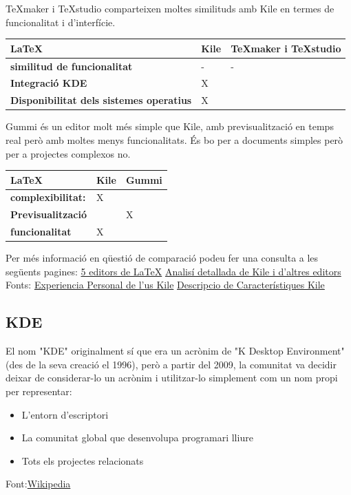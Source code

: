 TeXmaker i TeXstudio comparteixen moltes similituds amb Kile en termes de funcionalitat i d'interfície. \\

\begin{table}[h!]
 \begin{tabular}{|l|l|l|}
\hline
 \LaTeX & \textbf{Kile} & \textbf{TeXmaker i TeXstudio} \\ \hline
 \textbf{similitud de funcionalitat} & - & - \\ \hline
 \textbf{Integració KDE} & X & \\ \hline
 \textbf{Disponibilitat dels sistemes operatius} & X &  \\ \hline
 \end{tabular}
\end{table}

Gummi és un editor molt més simple que Kile, amb previsualització en temps real però amb moltes menys funcionalitats. És bo per a documents simples però per a projectes complexos no. \\
\begin{table}[h!]
 \begin{tabular}{|l|l|l|}
\hline
 \LaTeX & \textbf{Kile} & \textbf{Gummi} \\ \hline
 \textbf{complexibilitat:}  & X &  \\ \hline
 \textbf{Previsualització} &  & X \\ \hline
 \textbf{funcionalitat} & X &  \\ \hline
 \end{tabular}
\end{table}

Per més informació en qüestió de comparació podeu fer una consulta a les següents pagines: \href{https://osluca.uca.es/noticia/cinco-editores-de-latex-libres/}{5 editors de LaTeX} \href{https://latex.org/forum/viewtopic.php?t=208}{Analisí detallada de Kile i d'altres editors}
Fonts: \href{https://iloo.wordpress.com/2010/10/20/kile-otro-editor-latex/}{Experiencia Personal de l'us Kile} \href{https://www.kdeblog.com/editor-de-latex-para-kde-kile.html}{Descripcio de Característiques Kile}

\subsection{KDE}\label{subsec:KDE}
El nom "KDE" originalment sí que era un acrònim de "K Desktop Environment" (des de la seva creació el 1996), però a partir del 2009, la comunitat va decidir deixar de considerar-lo un acrònim i utilitzar-lo simplement com un nom propi per representar:
\begin{itemize}
 \item L'entorn d'escriptori
 \item La comunitat global que desenvolupa programari lliure
 \item Tots els projectes relacionats
\end{itemize}
Font:\href{https://ca.wikipedia.org/wiki/KDE}{Wikipedia}


